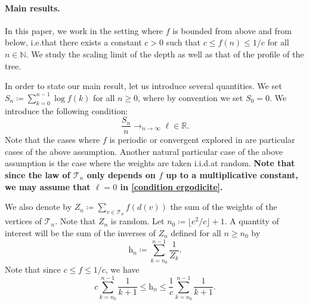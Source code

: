 \documentclass[11pt]{article}
\numberwithin{equation}{section}
\def \R{\mathbb {R}}
\def \N{\mathbb{N}}
\def \T{\mathcal{T}}
\begin{document}
\paragraph{Main results.} In this paper, we work in the setting where $f$ is bounded from above and from below, i.e.\@ that there exists a constant $c>0$ such that $c \le f(n) \le 1/c$ for all $n \in \N$. We study the scaling limit of the depth as well as that of the profile of the tree.

In order to state our main result, let us introduce several quantities. We set $S_n \coloneqq \sum_{k=0}^{n-1} \log f(k)$ for all $n\ge 0$, where by convention we set $S_0=0$. We introduce the following condition:
\begin{equation}\label{condition ergodicite}
	\frac{S_n}{n} \mathop{\longrightarrow}_{n\to \infty} \ell \in \R.
\end{equation}
Note that the cases where $f$ is periodic or convergent explored in \cite{LLLM26} are particular cases of the above assumption. Another natural particular case of the above assumption is the case where the weights are taken i.i.d.\@ at random. \textbf{Note that since the law of $\T_n$ only depends on $f$ up to a multiplicative constant, we may assume that $\ell=0$ in \eqref{condition ergodicite}.}

We also denote by $Z_n \coloneqq \sum_{v \in \T_n} f(d(v))$ the sum of the weights of the vertices of $\T_n$. Note that $Z_n$ is random.  Let $n_0\coloneqq \lfloor e^2/c \rfloor +1$. A quantity of interest will be the sum of the inverses of $Z_n$ defined for all $n\ge n_0$ by
\begin{equation}\label{eq h n}
	\mathrm{h}_n \coloneqq \sum_{k=n_0}^{n-1} \frac{1}{Z_k}.
\end{equation}
Note that since $c \le f \le 1/c$, we have
\begin{equation}\label{eq encadrement h n}
	c\sum_{k=n_0}^{n-1} \frac{1}{k+1} \le \mathrm{h}_n \le \frac{1}{c}\sum_{k=n_0}^{n-1} \frac{1}{k+1}.
\end{equation}
\end{document}
